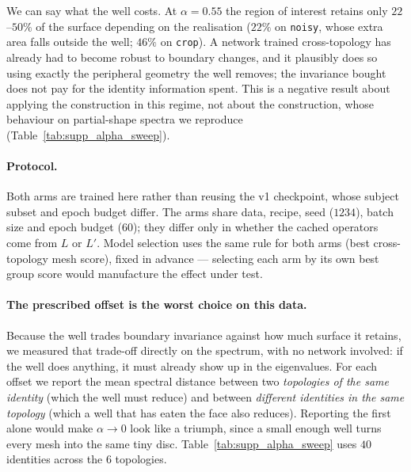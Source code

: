 \documentclass{article}
\begin{document}
We can say what the well costs. At $\alpha = 0.55$ the region of interest retains only
$22$--$50\%$ of the surface depending on the realisation ($22\%$ on \texttt{noisy}, whose extra
area falls outside the well; $46\%$ on \texttt{crop}). A network trained cross-topology has
already had to become robust to boundary changes, and it plausibly does so using exactly the
peripheral geometry the well removes; the invariance bought does not pay for the identity
information spent. This is a negative result about applying the construction in this regime, not
about the construction, whose behaviour on partial-shape spectra we reproduce
(Table~\ref{tab:supp_alpha_sweep}).

\paragraph{Protocol.} Both arms are trained here rather than reusing the v1 checkpoint, whose
subject subset and epoch budget differ. The arms share data, recipe, seed ($1234$), batch size
and epoch budget ($60$); they differ only in whether the cached operators come from $L$ or
$L'$. Model selection uses the same rule for both arms (best cross-topology mesh score), fixed
in advance --- selecting each arm by its own best group score would manufacture the effect
under test.

\paragraph{The prescribed offset is the worst choice on this data.}
Because the well trades boundary invariance against how much surface it retains, we measured
that trade-off directly on the spectrum, with no network involved: if the well does anything,
it must already show up in the eigenvalues. For each offset we report the mean spectral
distance between two \emph{topologies of the same identity} (which the well must reduce) and
between \emph{different identities in the same topology} (which a well that has eaten the face
also reduces). Reporting the first alone would make $\alpha \to 0$ look like a triumph, since
a small enough well turns every mesh into the same tiny disc. Table~\ref{tab:supp_alpha_sweep}
uses $40$ identities across the $6$ topologies.
\end{document}
